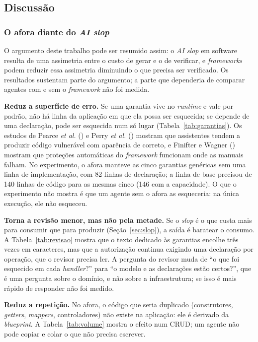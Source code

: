 \documentclass[a4paper,12pt]{article}
\newcommand{\estr}[1]{\textit{#1}}
\begin{document}
\subsection{Discussão}

\subsubsection{O afora diante do \textit{AI slop}}

O argumento deste trabalho pode ser resumido assim: o \estr{AI slop} em software resulta de uma assimetria entre o custo de gerar e o de verificar, e \estr{frameworks} podem reduzir essa assimetria diminuindo o que precisa ser verificado. Os resultados sustentam parte do argumento; a parte que dependeria de comparar agentes com e sem o \estr{framework} não foi medida.

\textbf{Reduz a superfície de erro.} Se uma garantia vive no \estr{runtime} e vale por padrão, não há linha da aplicação em que ela possa ser esquecida; se depende de uma declaração, pode ser esquecida num só lugar (Tabela~\ref{tab:garantias}). Os estudos de Pearce \textit{et al.} (\citeyear{pearce2022}) e Perry \textit{et al.} (\citeyear{perry2023}) mostram que assistentes tendem a produzir código vulnerável com aparência de correto, e Finifter e Wagner (\citeyear{finifter2011}) mostram que proteções automáticas do \estr{framework} funcionam onde as manuais falham. No experimento, o afora manteve as cinco garantias genéricas sem uma linha de implementação, com 82 linhas de declaração; a linha de base precisou de 140 linhas de código para as mesmas cinco (146 com a capacidade). O que o experimento não mostra é que um agente sem o afora as esqueceria: na única execução, ele não esqueceu.

\textbf{Torna a revisão menor, mas não pela metade.} Se o \estr{slop} é o que custa mais para consumir que para produzir (Seção~\ref{sec:slop}), a saída é baratear o consumo. A Tabela~\ref{tab:revisao} mostra que o texto dedicado às garantias encolhe três vezes em caracteres, mas que a autorização continua exigindo uma declaração por operação, que o revisor precisa ler. A pergunta do revisor muda de ``o que foi esquecido em cada \estr{handler}?'' para ``o modelo e as declarações estão certos?'', que é uma pergunta sobre o domínio, e não sobre a infraestrutura; se isso é mais rápido de responder não foi medido.

\textbf{Reduz a repetição.} No afora, o código que seria duplicado (construtores, \estr{getters}, \estr{mappers}, controladores) não existe na aplicação: ele é derivado da \estr{blueprint}. A Tabela~\ref{tab:volume} mostra o efeito num CRUD; um agente não pode copiar e colar o que não precisa escrever.
\end{document}

